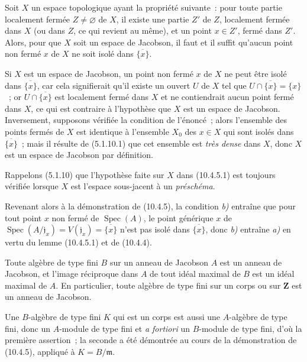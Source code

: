\begin{lemma}[10.4.5.1]
\label{IV.10.4.5.1-fr}
Soit $X$ un espace topologique ayant la propriété suivante~: pour toute partie
localement fermée $Z\neq\varnothing$ de $X$, il existe une partie $Z'$ de $Z$,
localement fermée dans $X$ (ou dans $Z$, ce qui revient au même), et un point
$x\in Z'$, fermé dans $Z'$. Alors, pour que $X$ soit un espace de Jacobson, il
faut et il suffit qu'aucun point non fermé $x$ de $X$ ne soit isolé dans
$\overline{\{x\}}$.
\end{lemma}

Si $X$ est un espace de Jacobson, un point non fermé $x$ de $X$ ne peut être
isolé dans $\overline{\{x\}}$, car cela signifierait qu'il existe un ouvert
$U$ de $X$ tel que $U\cap\overline{\{x\}}=\{x\}$~; or
$U\cap\overline{\{x\}}$ est localement fermé dans $X$ et ne contiendrait aucun
point fermé dans $X$, ce qui est contraire à l'hypothèse que $X$ est un espace
de Jacobson. Inversement, supposons vérifiée la condition de l'énoncé~; alors
l'ensemble des points fermés de $X$ est identique à l'ensemble $X_0$ des
$x\in X$ qui sont isolés dans $\overline{\{x\}}$~; mais il résulte de
(5.1.10.1) que
cet ensemble est \emph{très dense} dans $X$, donc $X$ est un espace de
Jacobson par définition.

Rappelons (5.1.10) que l'hypothèse faite sur $X$ dans (10.4.5.1) est toujours
vérifiée lorsque $X$ est l'espace sous-jacent à un \emph{préschéma}.

Revenant alors à la démonstration de (10.4.5), la condition \emph{b)} entraîne
que pour tout point $x$ non fermé de $\operatorname{Spec}(A)$, le point
générique $x$ de
$\operatorname{Spec}(A/\mathfrak j_x)=V(\mathfrak j_x)=\overline{\{x\}}$
n'est pas isolé dans $\overline{\{x\}}$, donc \emph{b)} entraîne \emph{a)} en
vertu du lemme (10.4.5.1) et de (10.4.4).

\begin{corollary}[10.4.6]
\label{IV.10.4.6-fr}
Toute algèbre de type fini $B$ sur un anneau de Jacobson $A$ est un anneau de
Jacobson, et l'image réciproque dans $A$ de tout idéal maximal de $B$ est un
idéal maximal de $A$. En particulier, toute algèbre de type fini sur un corps
ou sur $\mathbf Z$ est un anneau de Jacobson.
\end{corollary}

Une $B$-algèbre de type fini $K$ qui est un corps est aussi une $A$-algèbre de
type fini, donc un $A$-module de type fini et \emph{a fortiori} un $B$-module
de type fini, d'où la première assertion~; la seconde a été démontrée au cours
de la démonstration de (10.4.5), appliqué à $K=B/\mathfrak m$.

